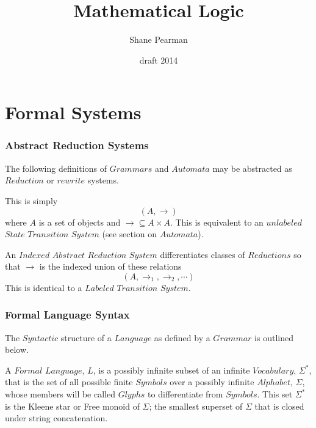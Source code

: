 \documentclass{article}
\begin{document}
\setcounter{secnumdepth}{5}
\setcounter{tocdepth}{5}


\title{Mathematical Logic}
\date{draft 2014}
\author{Shane Pearman}
\maketitle


\tableofcontents

\part{Formal Systems}


\section{Abstract Reduction Systems}
The following definitions of $Grammars$ and $Automata$ may be
abstracted as $Reduction$ or $rewrite$ systems.

This is simply
    \[(A,\rightarrow)\]
where $A$ is a set of objects and $\rightarrow \subseteq A \times
A$. This is equivalent to an $unlabeled$ $State$ $Transition$ $System$
(see section on $Automata$).

An $Indexed$ $Abstract$ $Reduction$ $System$ differentiates classes of
$Reductions$ so that $\rightarrow$ is the indexed union of these
relations
    \[(A, \rightarrow_1, \rightarrow_2, \cdots)\]
This is identical to a $Labeled$ $Transition$ $System$.


\section{Formal Language Syntax}

The $Syntactic$ structure of a $Language$ as defined by a $Grammar$ is
outlined below.

A $Formal$ $Language$, $L$, is a possibly infinite subset of an
infinite $Vocabulary$, $\Sigma^*$, that is the set of all possible
finite $Symbols$ over a possibly infinite $Alphabet$, $\Sigma$, whose
members will be called $Glyphs$ to differentiate from $Symbols$. This
set $\Sigma^*$ is the Kleene star or Free monoid of $\Sigma$; the
smallest superset of $\Sigma$ that is closed under string
concatenation.
\end{document}
